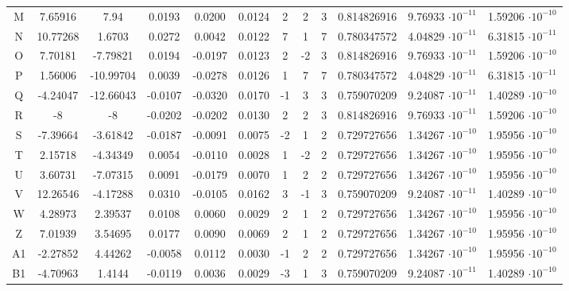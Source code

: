 \documentclass{scrartcl}
\begin{document}
\begin{table}[!ht]
{\begin{tabular}{c|c|c|c|c|c|c|c|c|c|c|c}
        M & 7.65916 & 7.94 &  0.0193  &  0.0200  &  0.0124  & 2 & 2 & 3 & 0.814826916 & 9.76933 $\cdot 10^{-11}$ & 1.59206 $\cdot 10^{-10}$  \\ 
        N & 10.77268 & 1.6703 &  0.0272  &  0.0042  &  0.0122  & 7 & 1 & 7 & 0.780347572 & 4.04829 $\cdot 10^{-11}$ & 6.31815 $\cdot 10^{-11}$  \\ 
        O & 7.70181 & -7.79821 &  0.0194  &  -0.0197 &  0.0123  & 2 & -2 & 3 & 0.814826916 & 9.76933 $\cdot 10^{-11}$ & 1.59206 $\cdot 10^{-10}$  \\ 
        P & 1.56006 & -10.99704 &  0.0039  &  -0.0278 &  0.0126  & 1 & 7 & 7 & 0.780347572 & 4.04829 $\cdot 10^{-11}$ & 6.31815 $\cdot 10^{-11}$  \\ 
        Q & -4.24047 & -12.66043 &  -0.0107 &  -0.0320 &  0.0170  & -1 & 3 & 3 & 0.759070209 & 9.24087 $\cdot 10^{-11}$ & 1.40289 $\cdot 10^{-10}$  \\ 
        R & -8 & -8 &  -0.0202 &  -0.0202 &  0.0130  & 2 & 2 & 3 & 0.814826916 & 9.76933 $\cdot 10^{-11}$ & 1.59206 $\cdot 10^{-10}$  \\ 
        S & -7.39664 & -3.61842 &  -0.0187 &  -0.0091 &  0.0075  & -2 & 1 & 2 & 0.729727656 & 1.34267 $\cdot 10^{-10}$ & 1.95956 $\cdot 10^{-10}$  \\ 
        T & 2.15718 & -4.34349 &  0.0054  &  -0.0110 &  0.0028  & 1 & -2 & 2 & 0.729727656 & 1.34267 $\cdot 10^{-10}$ & 1.95956 $\cdot 10^{-10}$  \\ 
        U & 3.60731 & -7.07315 &  0.0091  &  -0.0179 &  0.0070  & 1 & 2 & 2 & 0.729727656 & 1.34267 $\cdot 10^{-10}$ & 1.95956 $\cdot 10^{-10}$  \\ 
        V & 12.26546 & -4.17288 &  0.0310  &  -0.0105 &  0.0162  & 3 & -1 & 3 & 0.759070209 & 9.24087 $\cdot 10^{-11}$ & 1.40289 $\cdot 10^{-10}$  \\ 
        W & 4.28973 & 2.39537 &  0.0108  &  0.0060  &  0.0029  & 2 & 1 & 2 & 0.729727656 & 1.34267 $\cdot 10^{-10}$ & 1.95956 $\cdot 10^{-10}$  \\ 
        Z & 7.01939 & 3.54695 &  0.0177  &  0.0090  &  0.0069  & 2 & 1 & 2 & 0.729727656 & 1.34267 $\cdot 10^{-10}$ & 1.95956 $\cdot 10^{-10}$  \\ 
        A1 & -2.27852 & 4.44262 &  -0.0058 &  0.0112  &  0.0030  & -1 & 2 & 2 & 0.729727656 & 1.34267 $\cdot 10^{-10}$ & 1.95956 $\cdot 10^{-10}$  \\ 
        B1 & -4.70963 & 1.4144 &  -0.0119 &  0.0036  &  0.0029  & -3 & 1 & 3 & 0.759070209 & 9.24087 $\cdot 10^{-11}$ & 1.40289 $\cdot 10^{-10}$  \\ 

\end{tabular}}
\end{table}
\end{document}
